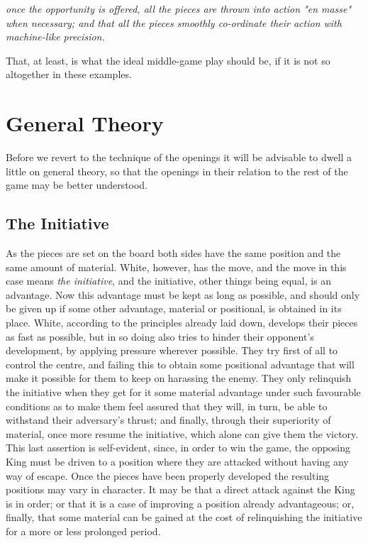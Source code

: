\documentclass[11pt,a4paper]{book}
\begin{document}
\emph{once the opportunity is offered, all the pieces are thrown into action "en masse" when necessary; and that all the pieces smoothly co-ordinate their action with machine-like precision.}

That, at least, is what the ideal middle-game play should be, if it is not so altogether in these examples.

\chapter{General Theory}

Before we revert to the technique of the openings it will be advisable to dwell a little on general theory, so that the openings in their relation to the rest of the game may be better understood.

\section{The Initiative}

As the pieces are set on the board both sides have the same position and the same amount of material. White, however, has the move, and the move in this case means \emph{the initiative}, and the initiative, other things being equal, is an advantage. Now this advantage must be kept as long as possible, and should only be given up if some other advantage, material or positional, is obtained in its place. White, according to the principles already laid down, develops their pieces as fast as possible, but in so doing also tries to hinder their opponent's development, by applying pressure wherever possible. They try first of all to control the centre, and failing this to obtain some positional advantage that will make it possible for them to keep on harassing the enemy. They only relinquish the initiative when they get for it some material advantage under such favourable conditions as to make them feel assured that they will, in turn, be able to withstand their adversary's thrust; and finally, through their superiority of material, once more resume the initiative, which alone can give them the victory. This last assertion is self-evident, since, in order to win the game, the opposing King must be driven to a position where they are attacked without having any way of escape. Once the pieces have been properly developed the resulting positions may vary in character. It may be that a direct attack against the King is in order; or that it is a case of improving a position already advantageous; or, finally, that some material can be gained at the cost of relinquishing the initiative for a more or less prolonged period.
\end{document}
